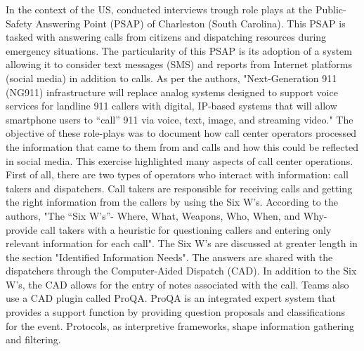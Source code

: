 In the context of the US, \textcite{graceRolePlayingNext2019} conducted interviews trough
role plays at the Public-Safety Answering Point (PSAP) of Charleston (South Carolina).
This PSAP is tasked with answering calls from citizens and dispatching resources during emergency situations.
The particularity of this PSAP is its adoption of a system allowing it to consider
text messages (SMS) and reports from Internet platforms (social media) in addition to calls.
As per the authors, "Next-Generation 911 (NG911) infrastructure will replace analog systems
designed to support voice services for landline 911 callers with digital, IP-based systems that
will allow smartphone users to “call” 911 via voice, text, image, and streaming video."
The objective of these role-plays was to document how call center operators processed the information that came to them from and calls and how this could be reflected in social media.
This exercise highlighted many aspects of call center operations.
First of all, there are two types of operators who interact with information: call takers and dispatchers.
Call takers are responsible for receiving calls and getting the right information from the callers by using the Six W's.
According to the authors, "The “Six W’s”- Where, What, Weapons, Who, When, and Why- provide call takers with
a heuristic for questioning callers and entering only relevant information for each call".
The Six W's are discussed at greater length in the section "Identified Information Needs".
The answers are shared with the dispatchers through the Computer-Aided Dispatch (CAD).
In addition to the Six W's, the CAD allows for the entry of notes associated with the call.
Teams also use a CAD plugin called ProQA.
ProQA is an integrated expert system that provides a support function by providing question proposals and classifications for the event.
Protocols, as interpretive frameworks, shape information gathering and filtering.

